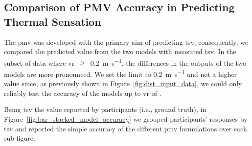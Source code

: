 \subsection{Comparison of PMV Accuracy in Predicting Thermal Sensation}\label{subsec:model-accuracy-comparison-in-predicting-thermal-sensation}
The \ac{pmv} was developed with the primary aim of predicting \ac{tsv}, consequently, we compared the predicted value from the two models with measured \ac{tsv}.
In the subset of data where \ac{vr}~$\geq$~\qty{0.2}{\m\per\s}, the differences in the outputs of the two models are more pronounced.
We set the limit to \qty{0.2}{\m\per\s} and not a higher value since, as previously shown in Figure~\ref{fig:dist_input_data}, we could only reliably test the accuracy of the models up to \ac{vr} of .

Being \ac{tsv} the value reported by participants (i.e., ground truth), in Figure~\ref{fig:bar_stacked_model_accuracy} we grouped participants' responses by \ac{tsv} and reported the simple accuracy of the different \ac{pmv} formulations over each sub-figure.
